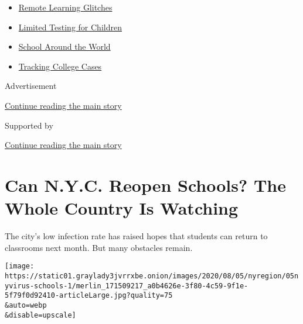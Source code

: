 \begin{itemize}
\tightlist
\item
  \href{https://www.nytimes3xbfgragh.onion/2020/09/08/us/school-districts-cyberattacks-glitches.html?name=styln-coronavirus-schools-reopening\&region=TOP_BANNER\&block=storyline_menu_recirc\&action=click\&pgtype=Article\&impression_id=6568e430-f2ca-11ea-bc7c-8fd709e972c8\&variant=undefined}{Remote
  Learning Glitches}
\item
  \href{https://www.nytimes3xbfgragh.onion/2020/09/08/upshot/children-testing-shortfalls-virus.html?name=styln-coronavirus-schools-reopening\&region=TOP_BANNER\&block=storyline_menu_recirc\&action=click\&pgtype=Article\&impression_id=6568e431-f2ca-11ea-bc7c-8fd709e972c8\&variant=undefined}{Limited
  Testing for Children}
\item
  \href{https://www.nytimes3xbfgragh.onion/2020/09/01/world/schools-reopen-globe-students.html?name=styln-coronavirus-schools-reopening\&region=TOP_BANNER\&block=storyline_menu_recirc\&action=click\&pgtype=Article\&impression_id=6568e432-f2ca-11ea-bc7c-8fd709e972c8\&variant=undefined}{School
  Around the World}
\item
  \href{https://www.nytimes3xbfgragh.onion/interactive/2020/us/covid-college-cases-tracker.html?name=styln-coronavirus-schools-reopening\&region=TOP_BANNER\&block=storyline_menu_recirc\&action=click\&pgtype=Article\&impression_id=65690b40-f2ca-11ea-bc7c-8fd709e972c8\&variant=undefined}{Tracking
  College Cases}
\end{itemize}

Advertisement

\protect\hyperlink{after-top}{Continue reading the main story}

Supported by

\protect\hyperlink{after-sponsor}{Continue reading the main story}

\hypertarget{can-nyc-reopen-schools-the-whole-country-is-watching}{%
\section{Can N.Y.C. Reopen Schools? The Whole Country Is
Watching}\label{can-nyc-reopen-schools-the-whole-country-is-watching}}

The city's low infection rate has raised hopes that students can return
to classrooms next month. But many obstacles remain.

\texttt{[image: https://static01.graylady3jvrrxbe.onion/images/2020/08/05/nyregion/05nyvirus-schools-1/merlin\_171509217\_a0b4626e-3f80-4c59-9f1e-5f79f0d92410-articleLarge.jpg?quality=75\\\&auto=webp\\\&disable=upscale]}

